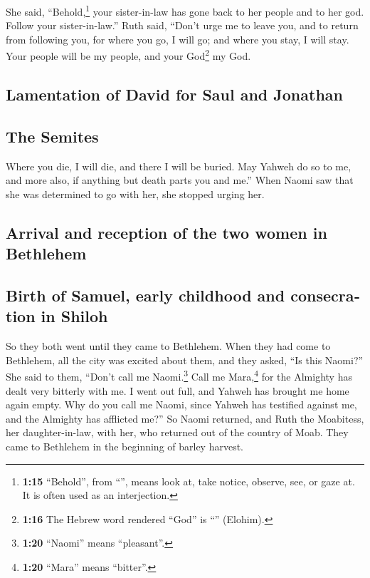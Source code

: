 \begin{paracol}{2}
\begin{otherlanguage}{english}
 She said, ``Behold,\footnote{\textbf{1:15} ``Behold'',
  from ``'', means look at, take notice, observe, see, or
  gaze at. It is often used as an interjection.} your sister-in-law has
gone back to her people and to her god. Follow your sister-in-law.''
 Ruth said, ``Don't urge me to leave you, and to return
from following you, for where you go, I will go; and where you stay, I
will stay. Your people will be my people, and your God\footnote{\textbf{1:16}
  The Hebrew word rendered ``God'' is ``'' (Elohim).} my
God.

\hypertarget{lamentation-of-david-for-saul-and-jonathan}{%
\subsection{Lamentation of David for Saul and
Jonathan}\label{lamentation-of-david-for-saul-and-jonathan}}

\hypertarget{the-semites}{%
\subsection{The Semites}\label{the-semites}}

 Where you die, I will die, and there I will be buried.
May Yahweh do so to me, and more also, if anything but death parts you
and me.''  When Naomi saw that she was determined to go
with her, she stopped urging her.

\hypertarget{arrival-and-reception-of-the-two-women-in-bethlehem}{%
\subsection{Arrival and reception of the two women in
Bethlehem}\label{arrival-and-reception-of-the-two-women-in-bethlehem}}

\hypertarget{birth-of-samuel-early-childhood-and-consecration-in-shiloh}{%
\subsection{Birth of Samuel, early childhood and consecration in
Shiloh}\label{birth-of-samuel-early-childhood-and-consecration-in-shiloh}}

 So they both went until they came to Bethlehem. When
they had come to Bethlehem, all the city was excited about them, and
they asked, ``Is this Naomi?''  She said to them, ``Don't
call me Naomi.\footnote{\textbf{1:20} ``Naomi'' means ``pleasant''.}
Call me Mara,\footnote{\textbf{1:20} ``Mara'' means ``bitter''.} for the
Almighty has dealt very bitterly with me.  I went out
full, and Yahweh has brought me home again empty. Why do you call me
Naomi, since Yahweh has testified against me, and the Almighty has
afflicted me?''  So Naomi returned, and Ruth the
Moabitess, her daughter-in-law, with her, who returned out of the
country of Moab. They came to Bethlehem in the beginning of barley
harvest.


\end{otherlanguage}
\end{paracol}
